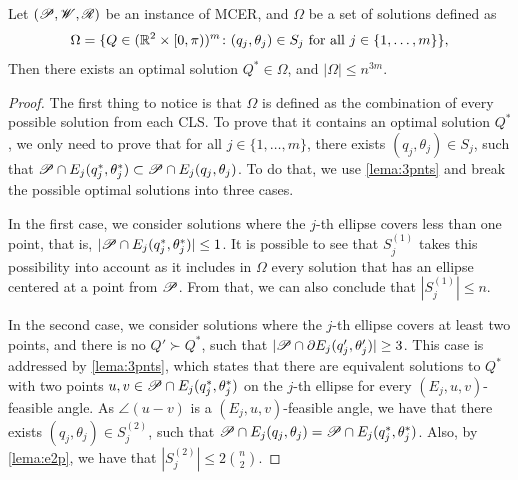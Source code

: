 \begin{thm}\label{th:mcer}
	Let $(\mathscr{P}, \mathscr{W}, \mathscr{R})$ be an instance of MCER, and $\Omega$ be a set of solutions defined as 
	\begin{equation*}\label{eq:omega}
	\Omega = \{Q \in (\mathbb{R}^2\times[0, \pi))^m \colon (q_j, \theta_j) \in S_j \textnormal{ for all } j\in\{1, \dots, m\}\},
	\end{equation*}
	Then there exists an optimal solution $Q^* \in \Omega$, and $|\Omega|\le n^{3m}$.
\end{thm}
\begin{proof}
	The first thing to notice is that $\Omega$ is defined as the combination of every possible solution from each CLS. To prove that it contains an optimal solution $Q^*$, we only need to prove that for all $j\in\{1, \dots, m\}$, there exists $(q_j, \theta_j)\in S_j$, such that $\mathscr{P} \cap E_j(q_j^*, \theta_j^*) \subset \mathscr{P} \cap E_j(q_j, \theta_j)$. To do that, we use \autoref{lema:3pnts} and break the possible optimal solutions into three cases.
	
	In the first case, we consider solutions where the $j$-th ellipse covers less than one point, that is, $|\mathscr{P} \cap E_j(q_j^*, \theta_j^*)|\le1$. It is possible to see that $S_j^{(1)}$ takes this possibility into account as it includes in $\Omega$ every solution that has an ellipse centered at a point from $\mathscr{P}$. From that, we can also conclude that $|S_j^{(1)}| \le n$.
	
	In the second case, we consider solutions where the $j$-th ellipse covers at least two points, and there is no $Q' \succ Q^*$, such that $|\mathscr{P} \cap \partial E_j(q_j', \theta_j')| \ge 3$.
	This case is addressed by \autoref{lema:3pnts}, which states that there are equivalent solutions to $Q^*$ with two points $u, v \in \mathscr{P} \cap E_j(q_j^*, \theta_j^*)$ on the $j$-th ellipse for every $(E_j, u, v)$-feasible angle.
	As $\angle(u-v)$ is a $(E_j, u, v)$-feasible angle, we have that there exists $(q_j, \theta_j) \in S_j^{(2)}$, such that $\mathscr{P} \cap E_j(q_j, \theta_j) = \mathscr{P} \cap E_j(q_j^*, \theta_j^*)$.
	Also, by \autoref{lema:e2p}, we have that $|S_j^{(2)}| \le 2\binom{n}{2}$.
	
	

\end{proof}
